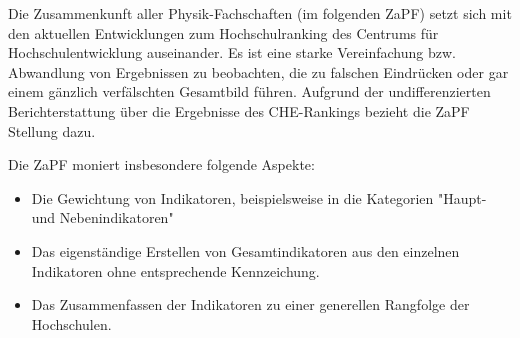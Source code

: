 Die Zusammenkunft aller Physik-Fachschaften (im folgenden \glqq{}ZaPF\grqq{}) setzt sich mit den aktuellen Entwicklungen zum Hochschulranking des Centrums für Hochschulentwicklung auseinander. 
Es ist eine starke Vereinfachung  bzw. Abwandlung von Ergebnissen zu beobachten, die zu falschen Eindrücken oder gar einem gänzlich verfälschten Gesamtbild führen. Aufgrund der undifferenzierten Berichterstattung über die Ergebnisse des CHE-Rankings bezieht die ZaPF Stellung dazu.
 
Die ZaPF moniert insbesondere folgende Aspekte:
\begin{itemize}
\item Die Gewichtung von Indikatoren, beispielsweise in die Kategorien "Haupt- und Nebenindikatoren"
\item Das eigenständige Erstellen von Gesamtindikatoren aus den einzelnen Indikatoren ohne entsprechende Kennzeichung.
\item Das Zusammenfassen der Indikatoren zu einer generellen Rangfolge der Hochschulen.
\end{itemize}

